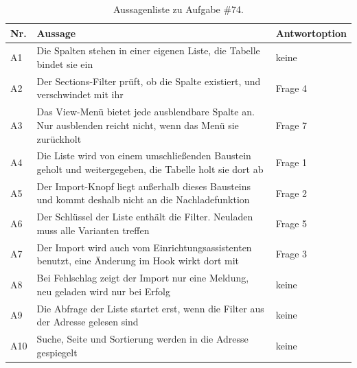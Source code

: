 \begin{table}[htbp]
  \centering
  \caption{Aussagenliste zu Aufgabe \#74.}
  \label{tab:aussagen-74}
  \small
  \begin{tabularx}{\textwidth}{l>{\raggedright\arraybackslash}Xl}
    \toprule
    Nr. & Aussage & Antwortoption \\
    \midrule
    A1 & Die Spalten stehen in einer eigenen Liste, die Tabelle bindet sie ein & keine \\
    A2 & Der Sections-Filter prüft, ob die Spalte existiert, und verschwindet mit ihr & Frage 4 \\
    A3 & Das View-Menü bietet jede ausblendbare Spalte an. Nur ausblenden reicht nicht, wenn das Menü sie zurückholt & Frage 7 \\
    A4 & Die Liste wird von einem umschließenden Baustein geholt und weitergegeben, die Tabelle holt sie dort ab & Frage 1 \\
    A5 & Der Import-Knopf liegt außerhalb dieses Bausteins und kommt deshalb nicht an die Nachladefunktion & Frage 2 \\
    A6 & Der Schlüssel der Liste enthält die Filter. Neuladen muss alle Varianten treffen & Frage 5 \\
    A7 & Der Import wird auch vom Einrichtungsassistenten benutzt, eine Änderung im Hook wirkt dort mit & Frage 3 \\
    A8 & Bei Fehlschlag zeigt der Import nur eine Meldung, neu geladen wird nur bei Erfolg & keine \\
    A9 & Die Abfrage der Liste startet erst, wenn die Filter aus der Adresse gelesen sind & keine \\
    A10 & Suche, Seite und Sortierung werden in die Adresse gespiegelt & keine \\
    \bottomrule
  \end{tabularx}
\end{table}

